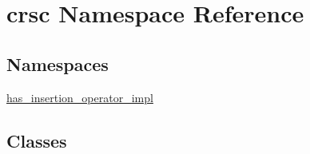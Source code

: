 \hypertarget{namespacecrsc}{}\section{crsc Namespace Reference}
\label{namespacecrsc}
\subsection*{Namespaces}
\begin{DoxyCompactItemize}
\item 
 \hyperlink{namespacecrsc_1_1has__insertion__operator__impl}{has\+\_\+insertion\+\_\+operator\+\_\+impl}
\end{DoxyCompactItemize}
\subsection*{Classes}
